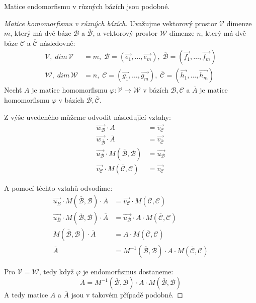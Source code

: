 \begin{theorem}
    Matice endomorfismu v různých bázích jsou podobné.
\end{theorem}
\begin{proof}[Matice homomorfismu v různých bázích]
    Uvažujme vektorový prostor $\mathcal{V}$ dimenze $m$, který má dvě báze $\mathcal{B}$ a $\overline{\mathcal{B}}$,
    a vektorový prostor $\mathcal{W}$ dimenze $n$, který má dvě báze $\mathcal{C}$ a $\overline{\mathcal{C}}$ následovně:
    \begin{align*}
        \mathcal{V}, \; dim\,\mathcal{V} &= m, \; \mathcal{B} = (\vec{e_1}, \ldots, \vec{e_m}),\; \overline{\mathcal{B}} = (\vec{f_1}, \ldots, \vec{f_m})\\
        \mathcal{W}, \; dim\,\mathcal{W} &= n, \; \mathcal{C} = (\vec{g_1}, \ldots, \vec{g_m}),\; \overline{\mathcal{C}} = (\vec{h_1}, \ldots, \vec{h_m})
    \end{align*}
    Nechť $A$ je matice homomorfismu $\varphi: \mathcal{V} \rightarrow \mathcal{W}$ v bázích $\mathcal{B}, \mathcal{C}$
    a $\overline{A}$ je matice homomorfismu $\varphi$ v bázích $\overline{\mathcal{B}}, \overline{\mathcal{C}}$.

    Z výše uvedeného můžeme odvodit následujicí vztahy:
    \begin{align}
        \vec{w_{\mathcal{B}}} \cdot A & = \vec{v_{\mathcal{C}}}\\
        \vec{w_{\overline{\mathcal{B}}}} \cdot \overline{A} & = \vec{v_{\overline{\mathcal{C}}}}\\
        \vec{u_{\mathcal{B}}} \cdot M(\overline{\mathcal{B}}, \mathcal{B}) & = \vec{u_{\mathcal{B}}}\\
        \vec{v_{\mathcal{C}}} \cdot M(\overline{\mathcal{C}}, \mathcal{C}) & = \vec{v_{\mathcal{C}}}
    \end{align}

    A pomocí těchto vztahů odvodíme: 
    \begin{align*}
        \vec{u_{\overline{B}}} \cdot M(\overline{\mathcal{B}}, \mathcal{B}) \cdot \overline{A} 
            &= \vec{v_{\mathcal{C}}} \cdot M(\overline{\mathcal{C}}, \mathcal{C})\\ 
        \vec{u_{\overline{B}}} \cdot M(\overline{\mathcal{B}}, \mathcal{B}) \cdot \overline{A} 
            &= \vec{u_{\mathcal{B}}} \cdot A \cdot M(\overline{\mathcal{C}}, \mathcal{C}) \\
        M(\overline{\mathcal{B}}, \mathcal{B}) \cdot \overline{A} &= 
            A \cdot M(\overline{\mathcal{C}}, \mathcal{C})\\ 
        \overline{A} &= 
            M^{-1}(\overline{\mathcal{B}}, \mathcal{B}) \cdot A \cdot M(\overline{\mathcal{C}}, \mathcal{C})
    \end{align*}

    Pro $\mathcal{V} = \mathcal{W}$, tedy když $\varphi$ je endomorfismus dostaneme:
    $$\overline{A} = M^{-1}(\overline{\mathcal{B}}, \mathcal{B}) \cdot A \cdot M(\overline{\mathcal{B}}, \mathcal{B})$$
    A tedy matice $A$ a $\overline{A}$ jsou v takovém případě podobné.
\end{proof}


